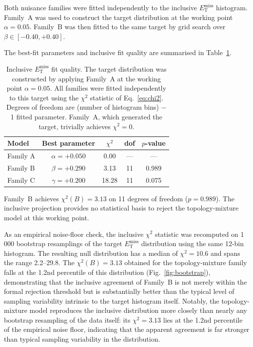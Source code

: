 \documentclass[a4paper,11pt]{article}
\newcommand{\MET}{\ensuremath{E_{\mathrm{T}}^{\mathrm{miss}}}\xspace}
\newcommand{\chisq}{\ensuremath{\chi^2}\xspace}
\begin{document}
Both nuisance families were fitted independently to the inclusive \MET
histogram.
Family~A was used to construct the target distribution at the working point
$\alpha = 0.05$.
Family~B was then fitted to the same target by grid search over $\beta \in
[-0.40, +0.40]$.

The best-fit parameters and inclusive fit quality are summarised in
Table~\ref{tab:inclusive_fit}.

\begin{table}[H]
  \centering
  \caption{Inclusive \MET fit quality.
    The target distribution was constructed by applying Family~A at the
    working point $\alpha = 0.05$.
    All families were fitted independently to this target using the
    $\chi^2$ statistic of Eq.~\eqref{eq:chi2}.
    Degrees of freedom are (number of histogram bins) $-$ 1 fitted
    parameter.
    Family~A, which generated the target, trivially achieves $\chi^2 = 0$.}
  \label{tab:inclusive_fit}
  \begin{tabular}{lcccc}
    \toprule
    Model & Best parameter & $\chi^2$ & dof & $p$-value \\
    \midrule
    Family A & $\alpha = +0.050$ &  0.00 & ---  & --- \\
    Family B & $\beta  = +0.290$ &  3.13 & 11   & 0.989 \\
    Family C & $\gamma = +0.200$ & 18.28 & 11   & 0.075 \\
    \bottomrule
  \end{tabular}
\end{table}

Family~B achieves $\chi^2(B) = 3.13$ on 11 degrees of freedom
($p = 0.989$).
The inclusive projection provides no statistical basis to reject the
topology-mixture model at this working point.

As an empirical noise-floor check, the inclusive \chisq statistic was
recomputed on 1\,000 bootstrap resamplings of the target \MET distribution
using the same 12-bin histogram.
The resulting null distribution has a median of $\chi^2 = 10.6$ and spans
the range 2.2--29.8.
The $\chi^2(B) = 3.13$ obtained for the topology-mixture family falls at
the 1.2nd percentile of this distribution (Fig.~\ref{fig:bootstrap}),
demonstrating that the inclusive agreement of Family~B is not merely within
the formal rejection threshold but is substantially better than the typical
level of sampling variability intrinsic to the target histogram itself.
Notably, the topology-mixture model reproduces the inclusive distribution
more closely than nearly any bootstrap resampling of the data itself: its
$\chi^2 = 3.13$ lies at the 1.2nd percentile of the empirical noise floor,
indicating that the apparent agreement is far stronger than typical sampling
variability in the distribution.
\end{document}
